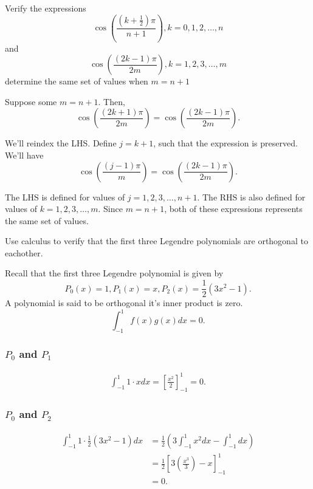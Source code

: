 \documentclass[5pt, a4paper]{article}
\begin{document}
\begin{tcolorbox}[title=Question 1]
    Verify the expressions \[
    \cos \left( \frac{(k + \frac{1}{2})\pi}{n+1} \right) 
    , k = 0,1,2,\ldots,n\] 
    and \[
    \cos \left( \frac{(2k-1)\pi}{2m} \right) 
    , k = 1,2,3,\ldots,m\] 
    determine the same set of values when $m = n + 1$
\end{tcolorbox}
Suppose some $m = n + 1$. Then,
\[
\cos \left( \frac{(2k + 1)\pi}{2m} \right) =
\cos \left( \frac{(2k-1)\pi}{2m} \right) 
.\] 

We'll reindex the LHS. Define $j = k + 1$, such that the expression is
preserved. We'll have
\[
\cos \left( \frac{(j - 1)\pi}{m} \right) =
\cos \left( \frac{(2k-1)\pi}{2m} \right) 
.\] 

The LHS is defined for values of $j = 1,2,3,\ldots,n+1$. The RHS is also defined
for values of $k = 1,2,3,\ldots,m$. Since $m=n+1$, both of these expressions
represents the same set of values.
\begin{tcolorbox}[title=Question 2]
    Use calculus to verify that the first three Legendre polynomials are
    orthogonal to eachother.
\end{tcolorbox}
Recall that the first three Legendre polynomial is given by \[
    P_0(x) = 1, P_1(x) = x, P_2(x) = \frac{1}{2}(3x^2 -1)
.\] 
A polynomial is said to be orthogonal it's inner product is zero. \[
    \int_{-1}^{1} f(x)g(x)dx = 0
.\] 
\subsubsection*{$P_0$ and $P_1$}
\begin{align*}
    \int_{-1}^{1} 1 \cdot x dx = \left[\frac{x^2}{2}\right]_{-1}^{1} = 0
.\end{align*}
\subsubsection*{$P_0$ and $P_2$}
\begin{align*}
    \int_{-1}^{1} 1 \cdot \frac{1}{2}(3x^2 - 1) dx &= \frac{1}{2}\left( 3
    \int_{-1}^{1} x^2dx - \int_{-1}^{1} dx  \right) \\
                                                   &= \frac{1}{2}\left[ 3 \left(
                                                   \frac{x^3}{3}\right) - x
                                               \right]_{-1}^{1} \\
                                               &= 0 
.\end{align*}
\end{document}
